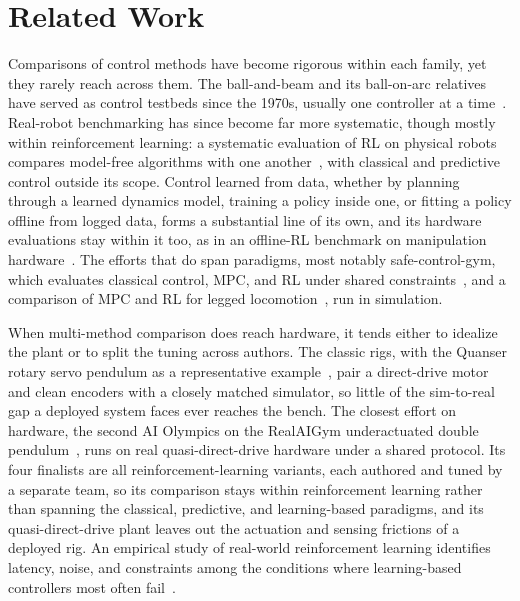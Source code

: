 \section{Related Work}
\label{sec:related}

Comparisons of control methods have become rigorous within each family, yet they rarely reach across them.
The ball-and-beam and its ball-on-arc relatives have served as control testbeds since the 1970s, usually one controller at a time~\cite{wellstead1978ballbeam}.
Real-robot benchmarking has since become far more systematic, though mostly within reinforcement learning: a systematic evaluation of RL on physical robots compares model-free algorithms with one another~\cite{mahmood2018benchmarking}, with classical and predictive control outside its scope.
Control learned from data, whether by planning through a learned dynamics model, training a policy inside one, or fitting a policy offline from logged data, forms a substantial line of its own, and its hardware evaluations stay within it too, as in an offline-RL benchmark on manipulation hardware~\cite{guertler2023benchmarking}.
The efforts that do span paradigms, most notably safe-control-gym, which evaluates classical control, MPC, and RL under shared constraints~\cite{yuan2022safecontrolgym}, and a comparison of MPC and RL for legged locomotion~\cite{akki2025benchmarking}, run in simulation.

When multi-method comparison does reach hardware, it tends either to idealize the plant or to split the tuning across authors.
The classic rigs, with the Quanser rotary servo pendulum as a representative example~\cite{quanser_qube2}, pair a direct-drive motor and clean encoders with a closely matched simulator, so little of the sim-to-real gap a deployed system faces ever reaches the bench.
The closest effort on hardware, the second AI Olympics on the RealAIGym underactuated double pendulum~\cite{wiebe2025reinforcementlearningrobustathletic}, runs on real quasi-direct-drive hardware under a shared protocol.
Its four finalists are all reinforcement-learning variants, each authored and tuned by a separate team, so its comparison stays within reinforcement learning rather than spanning the classical, predictive, and learning-based paradigms, and its quasi-direct-drive plant leaves out the actuation and sensing frictions of a deployed rig.
An empirical study of real-world reinforcement learning identifies latency, noise, and constraints among the conditions where learning-based controllers most often fail~\cite{dulac2021challenges}.

